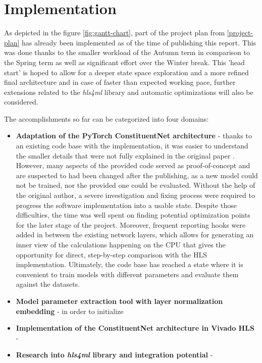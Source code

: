 \chapter{Implementation}\label{implementation}
As depicted in the figure \ref{fig:gantt-chart}, part of the project plan from \autoref{project-plan} has already been implemented as of the time of publishing this report. This was done thanks to the smaller workload of the Autumn term in comparison to the Spring term as well as significant effort over the Winter break. This 'head start' is hoped to allow for a deeper state space exploration and a more refined final architecture and in case of faster than expected working pace, further extensions related to the \textit{hls4ml} library and automatic optimizations will also be considered.

The accomplishments so far can be categorized into four domains:

\begin{itemize}
  \item \textbf{Adaptation of the PyTorch ConstituentNet architecture} - thanks to an existing code base with the implementation, it was easier to understand the smaller details that were not fully explained in the original paper \cite{3-yuan2021constituentnet:}. However, many aspects of the provided code served as proof-of-concept and are suspected to had been changed after the publishing, as a new model could not be trained, nor the provided one could be evaluated. Without the help of the original author, a severe investigation and fixing process were required to progress the software implementation into a usable state. Despite those difficulties, the time was well spent on finding potential optimization points for the later stage of the project. Moreover, frequent reporting hooks were added in between the existing network layers, which allows for generating an inner view of the calculations happening on the CPU that gives the opportunity for direct, step-by-step comparison with the HLS implementation. Ultimately, the code base has reached a state where it is convenient to train models with different parameters and evaluate them against the datasets.
  
  \item \textbf{Model parameter extraction tool with layer normalization embedding} - in order to initialize 
  
  \item \textbf{Implementation of the ConstituentNet architecture in Vivado HLS} - 
  
  \item \textbf{Research into \textit{hls4ml} library and integration potential} - 
  
\end{itemize}